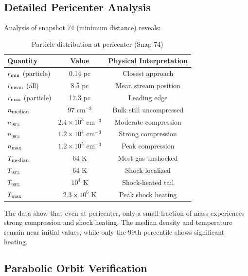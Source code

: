 \documentclass[twocolumn,amsmath,amssymb,prd,superscriptaddress,nofootinbib]{revtex4-2}
\begin{document}
\subsection{Detailed Pericenter Analysis}
\label{sec:pericenter_analysis}

Analysis of snapshot 74 (minimum distance) reveals:

\begin{table}[h]
\centering
\caption{Particle distribution at pericenter (Snap 74)}
\label{tab:pericenter_detail}
\begin{tabular}{lcc}
\toprule
Quantity & Value & Physical Interpretation \\
\midrule
$r_{\rm min}$ (particle) & 0.14 pc & Closest approach \\
$r_{\rm mean}$ (all) & 8.5 pc & Mean stream position \\
$r_{\rm max}$ (particle) & 17.3 pc & Leading edge \\
\midrule
$n_{\rm median}$ & $97$ cm$^{-3}$ & Bulk still uncompressed \\
$n_{90\%}$ & $2.4\times 10^3$ cm$^{-3}$ & Moderate compression \\
$n_{99\%}$ & $1.2\times 10^4$ cm$^{-3}$ & Strong compression \\
$n_{\rm max}$ & $1.2\times 10^5$ cm$^{-3}$ & Peak compression \\
\midrule
$T_{\rm median}$ & 64 K & Most gas unshocked \\
$T_{90\%}$ & 64 K & Shock localized \\
$T_{99\%}$ & $10^4$ K & Shock-heated tail \\
$T_{\rm max}$ & $2.3\times 10^6$ K & Peak shock heating \\
\bottomrule
\end{tabular}
\end{table}

The data show that even at pericenter, only a small fraction of mass experiences strong compression and shock heating. The median density and temperature remain near initial values, while only the 99th percentile shows significant heating.

\subsection{Parabolic Orbit Verification}
\label{sec:parabolic_verification}
\end{document}
